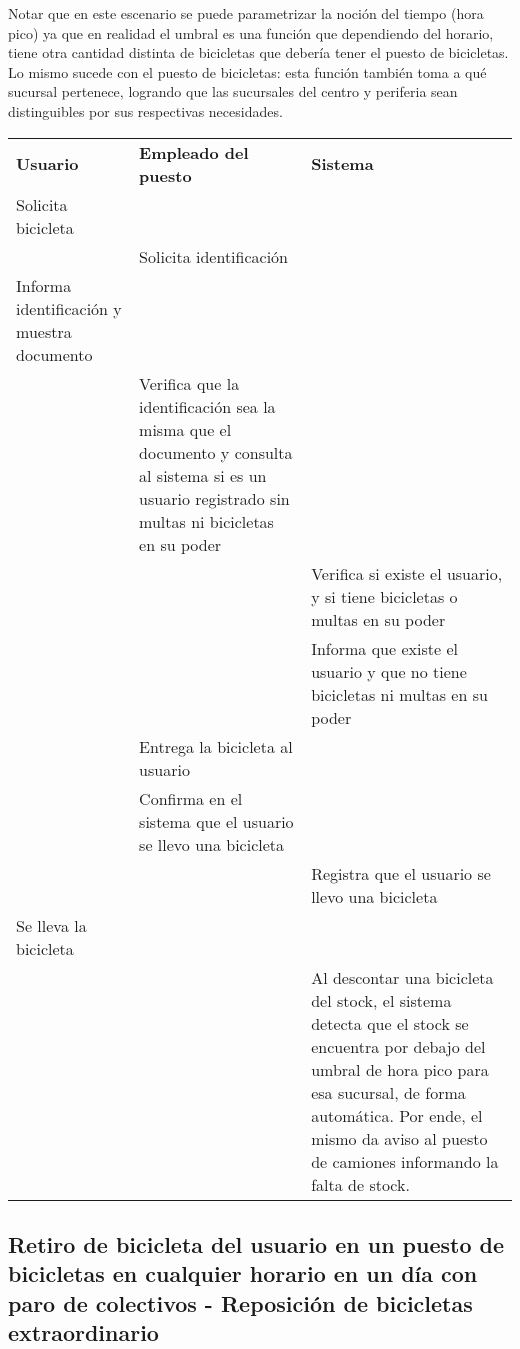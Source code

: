 \documentclass[a4paper, 11pt, spanish]{article}
\begin{document}
Notar que en este escenario se puede parametrizar la noción del tiempo (hora pico) ya que en realidad el umbral es una función que dependiendo del horario, tiene otra cantidad distinta de bicicletas que debería tener el puesto de bicicletas. Lo mismo sucede con el puesto de bicicletas: esta función también toma a qué sucursal pertenece, logrando que las sucursales del centro y periferia sean distinguibles por sus respectivas necesidades.

\vspace*{0.7cm}

\begingroup
    \fontsize{8pt}{12pt}\selectfont

\begin{tabular}{|p{5cm}|p{5cm}|p{5cm}|}
\cline{1-3}
\textbf{Usuario} & \textbf{Empleado del puesto} & \textbf{Sistema} \\ \cline{1-3}
Solicita bicicleta&&\\ \cline{1-3}
&Solicita identificación&\\ \cline{1-3}
Informa identificación y muestra documento&&\\ \cline{1-3}
&Verifica que la identificación sea la misma que el documento y consulta al sistema si es un usuario registrado sin multas ni bicicletas en su poder&\\ \cline{1-3}
&&Verifica si existe el usuario, y si tiene bicicletas o multas en su poder\\ \cline{1-3}
&&Informa que existe el usuario y que no tiene bicicletas ni multas en su poder\\ \cline{1-3}
&Entrega la bicicleta al usuario&\\ \cline{1-3}
&Confirma en el sistema que el usuario se llevo una bicicleta&\\ \cline{1-3}
&&Registra que el usuario se llevo una bicicleta\\ \cline{1-3}
Se lleva la bicicleta&&\\ \cline{1-3}
&&Al descontar una bicicleta del stock, el sistema detecta que el stock se encuentra por debajo del umbral de hora pico para esa sucursal, de forma automática. Por ende, el mismo da aviso al puesto de camiones informando la falta de stock.\\ \cline{1-3}
\end{tabular}

\endgroup

\subsection{Retiro de bicicleta del usuario en un puesto de bicicletas en cualquier horario en un día con paro de colectivos - Reposición de bicicletas extraordinario}
\end{document}
